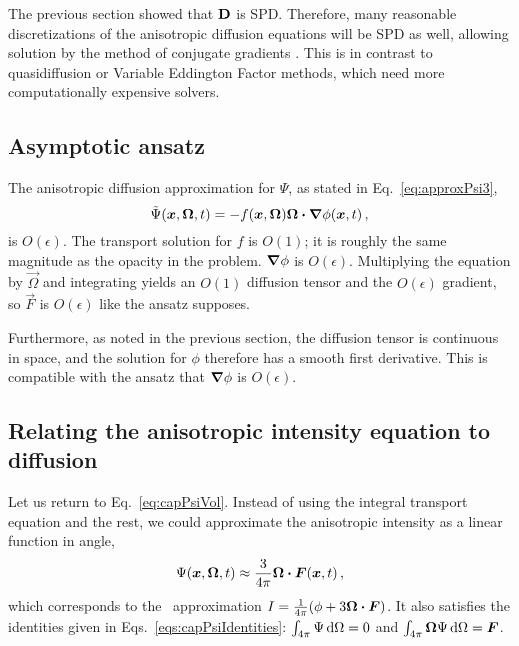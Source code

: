 The previous section showed that $\mathbf{D}$ is SPD. Therefore, many reasonable
discretizations of the anisotropic diffusion equations will be SPD as well,
allowing
solution by the method of conjugate gradients \cite{Tre1997}. This is in
contrast to quasidiffusion or Variable Eddington Factor methods, which need
more computationally expensive solvers.

\subsection{Asymptotic ansatz}
The anisotropic diffusion approximation for $\Psi$, as stated in
Eq.~\eqref{eq:approxPsi3},
\begin{equation*}
\tilde\Psi(\bm{x}, \bm{\Omega}, t) = - f(\bm{x}, \bm{\Omega})
\bm{\Omega}\bm{\cdot} \bm{\nabla} \phi(\bm{x}, t)\,,
\end{equation*}
is $O(\epsilon)$. The transport solution for $f$ is $O(1)$; it is roughly the
same magnitude as the opacity in the problem. $\bm{\nabla} \phi$ is $O(\epsilon)$.
Multiplying the equation by $\vec{\Omega}$ and integrating yields an $O(1)$
diffusion tensor and the $O(\epsilon)$ gradient, so $\vec{F}$ is $O(\epsilon)$
like the ansatz supposes.

Furthermore, as noted in the previous section, the diffusion tensor is
continuous in space, and the solution for $\phi$ therefore has a smooth first
derivative. This is compatible with the ansatz that $\bm{\nabla} \phi$
is $O(\epsilon)$.

\subsection{Relating the anisotropic intensity equation to
diffusion}\label{sec:adDiscDiff}
Let us return to Eq.~\eqref{eq:capPsiVol}. Instead of using the integral
transport equation and the rest, we could approximate the anisotropic intensity
as a linear function in angle,
\begin{equation*}
  \Psi(\bm{x}, \bm{\Omega}, t) \approx \frac{3}{4\pi} \bm{\Omega} \bm{\cdot}
  \bm{F}(\bm{x}, t)\,,
\end{equation*}
which corresponds to the \Pone\ approximation $I= \frac{1}{4\pi} (\phi +
3\bm{\Omega} \bm{\cdot} \bm{F})$. It also satisfies the identities given in
Eqs.~\eqref{eqs:capPsiIdentities}: $\int_{4\pi} \Psi \mathop{}\!\mathrm{d}\Omega = 0$ and
$\int_{4\pi} \bm{\Omega} \Psi \mathop{}\!\mathrm{d}\Omega = \bm{F}$.

